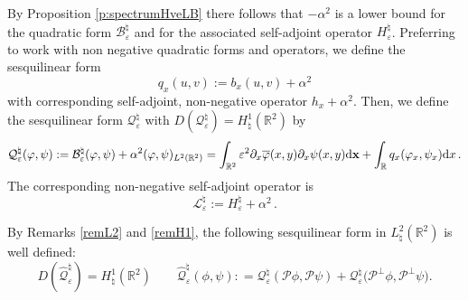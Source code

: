 \documentclass[a4paper,11pt,reqno]{amsart}
\theoremstyle{definition}
\numberwithin{equation}{section}
\newcommand{\RE}{\mathbb R}
\newcommand{\BB}{\mathcal B}
\newcommand{\QQ}{\mathcal Q}
\newcommand{\Lscr}{\mathscr{L}}
\newcommand{\ve}{\varepsilon}
\renewcommand{\d}{\mathrm{d}}
\newcommand{\x}{{\bf  x}}
\newcommand{\bosfer}{{\natural}}
\newcommand{\be}{\begin{equation}}
\newcommand{\ee}{\end{equation}}
\begin{document}
By Proposition \ref{p:spectrumHveLB} there follows that $-\alpha^2$ is a lower bound for the quadratic form $\BB^\bosfer_{\ve}$ and for the associated self-adjoint operator $H^\bosfer_\ve$. Preferring to work with non negative quadratic forms and operators, we define the sesquilinear form 
\begin{equation*}%
q_x (u,v) := b_x(u,v) +\alpha^2
\end{equation*}
with corresponding self-adjoint, non-negative operator $h_x +\alpha^2$.
Then, we define the sesquilinear  form $\QQ_\ve^\bosfer$ with $D(\QQ_\ve^\bosfer) = H_{\bosfer}^1(\RE^2)$ by
\be\label{r:Qve}
\QQ^\bosfer_{\ve} (\varphi, \psi):= \BB^\bosfer_{\ve} (\varphi, \psi) +\alpha^2(\varphi, \psi)_{L^2(\RE^2)} = \int_{\RE^2} \ve^2 {\partial_x \overline\varphi(x,y)}\partial_x \psi(x,y) \d\x  +\int_\RE  q_x(\varphi_x,\psi_x)\d x \,.
\ee
The corresponding non-negative self-adjoint operator is \[\Lscr_\ve^\bosfer:= H^\bosfer_\ve+\alpha^2\,.
\] 


By Remarks \ref{remL2} and \ref{remH1}, the following sesquilinear form in $L^{2}_{\bosfer}(\RE^{2})$ is well defined: 
\begin{equation*}
 D(\widehat{\QQ}^{\bosfer}_\ve) =   H_{\bosfer}^1(\RE^2) \qquad \widehat{\QQ}^{\bosfer}_\ve(\phi, \psi)   : = {\QQ}^{\bosfer}_\ve (\mathcal{P} \phi, \mathcal{P} \psi)+{\QQ}^{\bosfer}_\ve \big(\mathcal{P}^{\perp} \phi, \mathcal{P}^{\perp} \psi\big).
\end{equation*}
\end{document}
